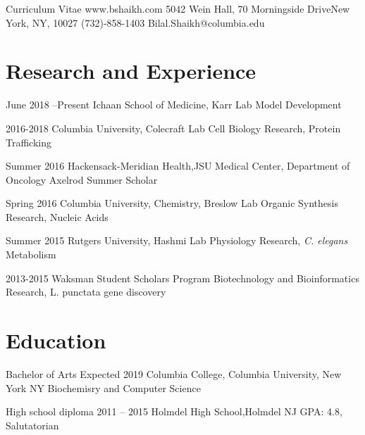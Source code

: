 \documentclass{bscv}
\begin{document}
  {Curriculum Vitae} {www.bshaikh.com} {5042 Wein Hall, 70 Morningside Drive\newline New York, NY, 10027} {(732)-858-1403} {Bilal.Shaikh@columbia.edu}


\section{Research and Experience}

\begin{eventlist}
 
\item{June 2018 --Present} 
  {Ichaan School of Medicine, Karr Lab}
  {Model Development}

\item{2016-2018}
  {Columbia University, Colecraft Lab}
  {Cell Biology Research, Protein Trafficking}

\item{Summer 2016}
  {Hackensack-Meridian Health,\newline JSU Medical Center, Department of Oncology}
  {Axelrod Summer Scholar}
  
\item{Spring 2016}
  {Columbia University, Chemistry, Breslow Lab}
  {Organic Synthesis Research, Nucleic Acids}

\item{Summer 2015}
  {Rutgers University, Hashmi Lab}
  { Physiology Research, \textit{C. elegans} Metabolism}
  
\item{2013-2015}
  {Waksman Student Scholars Program}
  {Biotechnology and Bioinformatics Research, L. punctata gene discovery}
\end{eventlist}

\section{Education}

\begin{yearlist}

\item[Bachelor of Arts]{Expected  2019}
  {Columbia College, \newline Columbia University, \newline New York NY} {Biochemisry and \newline Computer Science}

  

\item[High school diploma]{2011 -- 2015}
  {Holmdel High School,\newline Holmdel NJ}
  {GPA: 4.8, Salutatorian}
  
\end{yearlist}
\end{document}
